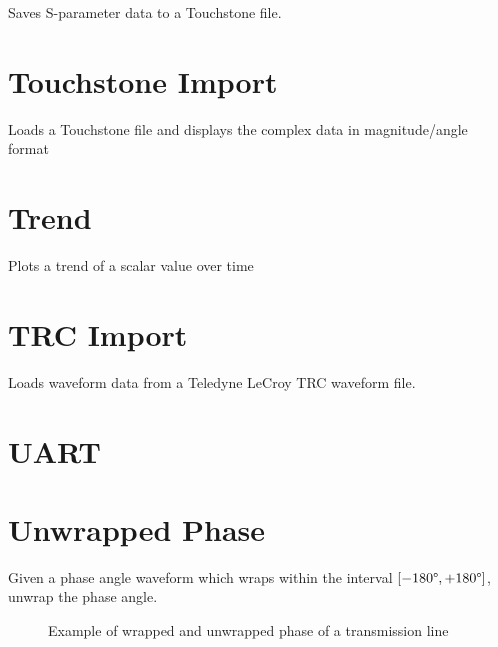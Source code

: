 Saves S-parameter data to a Touchstone file.

\pagebreak
\section{Touchstone Import}

Loads a Touchstone file and displays the complex data in magnitude/angle format

\pagebreak
\section{Trend}

Plots a trend of a scalar value over time

\pagebreak
\section{TRC Import}

Loads waveform data from a Teledyne LeCroy TRC waveform file.

\pagebreak
\section{UART}

\pagebreak
\section{Unwrapped Phase}

Given a phase angle waveform which wraps within the interval $[-180\degree, +180 \degree]$, unwrap the phase angle.

\begin{figure}[h]
\centering
{}
\caption{Example of wrapped and unwrapped phase of a transmission line}
\label{unwrapped_phase_example}
\end{figure}

